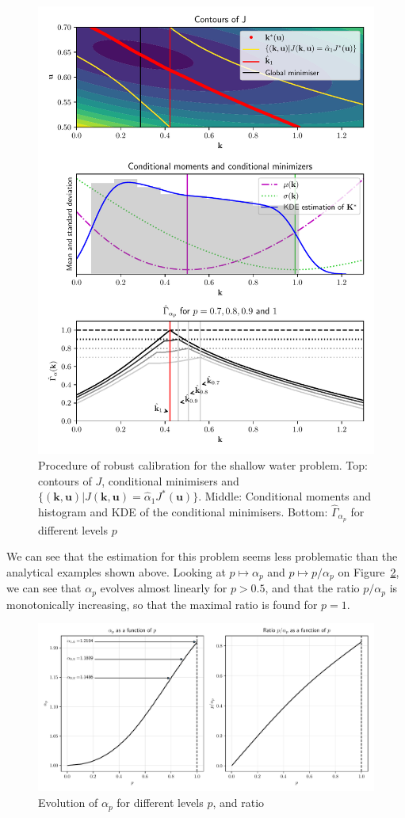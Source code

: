 \documentclass[preprint, 1p]{elsarticle}
\begin{document}
\begin{figure}[!h]
\centering
\includegraphics[width=.7\textwidth]{Figures/RobustSWEmis_plots.pdf}
\caption{Procedure of robust calibration for the shallow water problem. Top: contours of $J$, conditional minimisers and $\{(\mathbf{k},\mathbf{u}) | J(\mathbf{k},\mathbf{u}) = \hat{\alpha}_1 J^*(\mathbf{u})\}$. Middle: Conditional moments and histogram and KDE of the conditional minimisers. Bottom: $\hat{\Gamma}_{\alpha_p}$ for different levels $p$}
\label{fig:estimation_swe}
\end{figure}

We can see that the estimation for this problem seems less problematic than the analytical examples shown above. Looking at $p\mapsto \alpha_p$ and $p\mapsto p/\alpha_p$ on Figure~\ref{fig:alpha_p_SWE}, we can see that $\alpha_p$ evolves almost linearly for $p>0.5$, and that the ratio $p/\alpha_p$ is monotonically increasing, so that the maximal ratio is found for $p=1$.

\begin{figure}[!h]
  \centering
  \includegraphics[scale=0.5]{Figures/alpha_SWE}
  \caption{Evolution of $\alpha_p$ for different levels $p$, and ratio}
\label{fig:alpha_p_SWE}
\end{figure}
\end{document}
